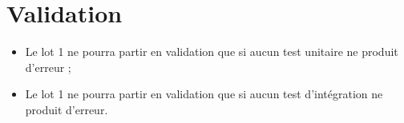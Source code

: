 \section{Validation}	
	\begin{itemize}
		\item Le lot 1 ne pourra partir en validation que si aucun test unitaire ne produit d'erreur ;
		\item Le lot 1 ne pourra partir en validation que si aucun test d’intégration ne produit d'erreur.
	\end{itemize}
	
